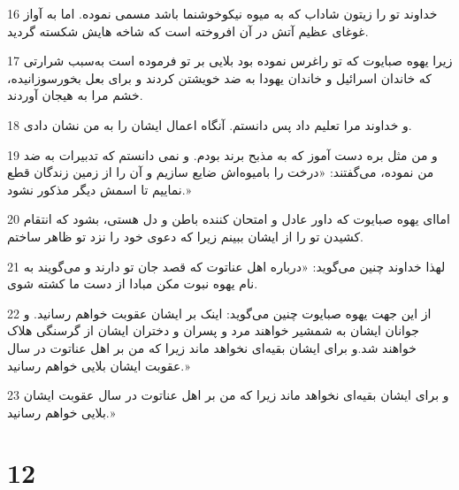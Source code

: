 \par 16 خداوند تو را زیتون شاداب که به میوه نیکوخوشنما باشد مسمی نموده. اما به آواز غوغای عظیم آتش در آن افروخته است که شاخه هایش شکسته گردید. 
\par 17 زیرا یهوه صبایوت که تو راغرس نموده بود بلایی بر تو فرموده است به‌سبب شرارتی که خاندان اسرائیل و خاندان یهودا به ضد خویشتن کردند و برای بعل بخور‌سوزانیده، خشم مرا به هیجان آوردند.
\par 18 و خداوند مرا تعلیم داد پس دانستم. آنگاه اعمال ایشان را به من نشان دادی.
\par 19 و من مثل بره دست آموز که به مذبح برند بودم. و نمی دانستم که تدبیرات به ضد من نموده، می‌گفتند: «درخت را بامیوه‌اش ضایع سازیم و آن را از زمین زندگان قطع نماییم تا اسمش دیگر مذکور نشود.»
\par 20 اما‌ای یهوه صبایوت که داور عادل و امتحان کننده باطن و دل هستی، بشود که انتقام کشیدن تو را از ایشان ببینم زیرا که دعوی خود را نزد تو ظاهر ساختم.
\par 21 لهذا خداوند چنین می‌گوید: «درباره اهل عناتوت که قصد جان تو دارند و می‌گویند به نام یهوه نبوت مکن مبادا از دست ما کشته شوی.
\par 22 از این جهت یهوه صبایوت چنین می‌گوید: اینک بر ایشان عقوبت خواهم رسانید. و جوانان ایشان به شمشیر خواهند مرد و پسران و دختران ایشان از گرسنگی هلاک خواهند شد.و برای ایشان بقیه‌ای نخواهد ماند زیرا که من بر اهل عناتوت در سال عقوبت ایشان بلایی خواهم رسانید.»
\par 23 و برای ایشان بقیه‌ای نخواهد ماند زیرا که من بر اهل عناتوت در سال عقوبت ایشان بلایی خواهم رسانید.»
 
\chapter{12}

